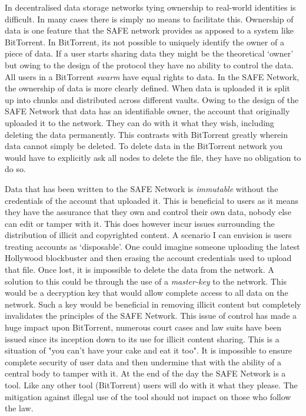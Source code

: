 In decentralised data storage networks tying ownership to real-world identities is difficult. In many cases there is simply no means to facilitate this. Ownership of data is one feature that the SAFE network provides as apposed to a system like BitTorrent. In BitTorrent, its not possible to uniquely identify the owner of a piece of data. If a user starts sharing data they might be the theoretical `owner' but owing to the design of the protocol they have no ability to control the data. All users in a BitTorrent \textit{swarm} have equal rights to data. In the SAFE Network, the ownership of data is more clearly defined. When data is uploaded it is split up into chunks and distributed across different vaults. Owing to the design of the SAFE Network that data has an identifiable owner, the account that originally uploaded it to the network. They can do with it what they wish, including deleting the data permanently. This contrasts with BitTorrent greatly wherein data cannot simply be deleted. To delete data in the BitTorrent network you would have to explicitly ask all nodes to delete the file, they have no obligation to do so.

Data that has been written to the SAFE Network is \textit{immutable} without the credentials of the account that uploaded it. This is beneficial to users as it means they have the assurance that they own and control their own data, nobody else can edit or tamper with it. This does however incur issues surrounding the distribution of illicit and copyrighted content. A scenario I can envision is users treating accounts as `disposable'. One could imagine someone uploading the latest Hollywood blockbuster and then erasing the account credentials used to upload that file. Once lost, it is impossible to delete the data from the network. A solution to this could be through the use of a \textit{master-key} to the network. This would be a decryption key that would allow complete access to all data on the network. Such a key would be beneficial in removing illicit content but completely invalidates the principles of the SAFE Network. This issue of control has made a huge impact upon BitTorrent, numerous court cases and law suits have been issued since its inception down to its use for illicit content sharing. This is a situation of "you can't have your cake and eat it too". It is impossible to ensure complete security of user data and then undermine that with the ability of a central body to tamper with it. At the end of the day the SAFE Network is a tool. Like any other tool (BitTorrent) users will do with it what they please. The mitigation against illegal use of the tool should not impact on those who follow the law.

